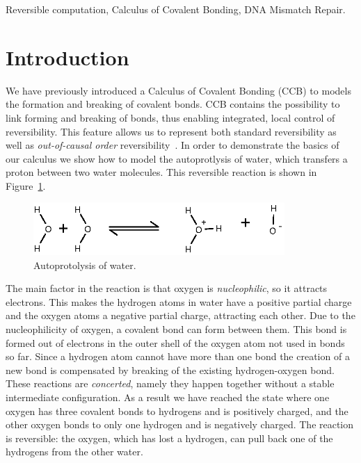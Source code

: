 \documentclass[review]{elsarticle}
\begin{document}
\begin{frontmatter}
\begin{keyword}Reversible computation, Calculus of Covalent Bonding, DNA Mismatch Repair.
\end{keyword}

\end{frontmatter}

\linenumbers

\section{Introduction}

We have previously introduced a Calculus of Covalent  Bonding (CCB) \cite{KU16,KU2017} to models the formation and breaking of covalent bonds. %
CCB contains the possibility to link forming and breaking of bonds, thus enabling integrated, local control of reversibility. This feature allows us to represent both standard reversibility as well as \emph{out-of-causal order} reversibility~\cite{Irek2012}. In order to demonstrate the basics of our calculus we show how to model the autoprotlysis of water, which transfers a proton between two water molecules. 
This reversible reaction is shown in Figure~\ref{fig:autoprotolysis}.
%
\begin{figure}
\centering
\includegraphics[height=2cm]{autoprotolysis}
\caption{Autoprotolysis of water.}
\label{fig:autoprotolysis}
\end{figure}

The main factor in the reaction is that oxygen is \emph{nucleophilic}, so it attracts electrons. This makes the hydrogen atoms in water
have a positive partial charge and the oxygen atoms a negative partial charge, attracting each other. Due to the nucleophilicity of 
oxygen, a covalent bond can form between them. This bond is formed out of electrons in the outer shell of the oxygen atom not used in bonds so far. Since a hydrogen atom cannot have more than one bond the creation of a new bond is compensated by breaking of the existing hydrogen-oxygen bond.
These reactions are \emph{concerted}, namely they happen together without a stable intermediate configuration. As a result we have reached the state where one oxygen has three covalent bonds to hydrogens and is positively charged,
and the other oxygen bonds to only one hydrogen and is negatively charged. The reaction is reversible: the oxygen, which has lost a hydrogen, can 
pull back one of the hydrogens from the other water.
\end{document}
